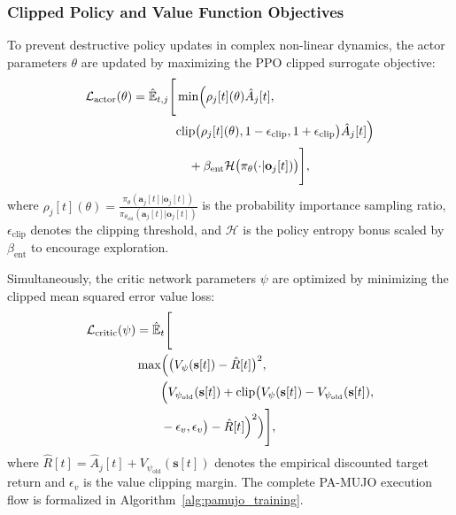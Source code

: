 \documentclass[journal]{IEEEtran}
\begin{document}
\subsubsection{Clipped Policy and Value Function Objectives}
To prevent destructive policy updates in complex non-linear dynamics, the actor parameters $\theta$ are updated by maximizing the PPO clipped surrogate objective:
\begin{equation}
\begin{aligned}
    \mathcal{L}_{\mathrm{actor}}(\theta) = \hat{\mathbb{E}}_{t, j} \Biggl[ &\min\Bigl( \rho_j[t](\theta) \hat{A}_j[t], \\
    &\mathrm{clip}\bigl(\rho_j[t](\theta), 1-\epsilon_{\mathrm{clip}},
    1+\epsilon_{\mathrm{clip}}\bigr) \hat{A}_j[t] \Bigr) \\
    &\quad + \beta_{\mathrm{ent}} \mathcal{H}\bigl(\pi_\theta(\cdot | \mathbf{o}_j[t])\bigr) \Biggr],
\end{aligned}
    \label{eq:actor_loss}
\end{equation}
where $\rho_j[t](\theta) = \frac{\pi_\theta(\mathbf{a}_j[t] | \mathbf{o}_j[t])}{\pi_{\theta_{\mathrm{old}}}(\mathbf{a}_j[t] | \mathbf{o}_j[t])}$ is the probability importance sampling ratio, $\epsilon_{\mathrm{clip}}$ denotes the clipping threshold, and $\mathcal{H}$ is the policy entropy bonus scaled by $\beta_{\mathrm{ent}}$ to encourage exploration.

Simultaneously, the critic network parameters $\psi$ are optimized by minimizing the clipped mean squared error value loss:
\begin{equation}
\begin{aligned}
    \mathcal{L}_{\mathrm{critic}}(\psi) &= \hat{\mathbb{E}}_t \Biggl[ \\
    &\max\Bigl(\bigl(V_\psi(\mathbf{s}[t]) - \hat{R}[t]\bigr)^2, \\
    &\qquad \Bigl(V_{\psi_{\mathrm{old}}}(\mathbf{s}[t]) +
    \mathrm{clip}\bigl(V_\psi(\mathbf{s}[t]) - V_{\psi_{\mathrm{old}}}(\mathbf{s}[t]), \\
    &\qquad -\epsilon_v, \epsilon_v\bigr) - \hat{R}[t]\Bigr)^2\Bigr)\Biggr],
\end{aligned}
\label{eq:critic_loss}
\end{equation}
where $\hat{R}[t] = \hat{A}_j[t] + V_{\psi_{\mathrm{old}}}(\mathbf{s}[t])$ denotes the empirical discounted target return and $\epsilon_v$ is the value clipping margin. The complete PA-MUJO execution flow is formalized in Algorithm~\ref{alg:pamujo_training}.
\end{document}

